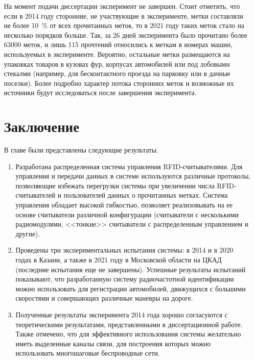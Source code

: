 На момент подачи диссертации эксперимент не завершен. Стоит отметить, что если в 2014 году сторонние, не участвующие в эксперименте, метки составляли не более 10~\% от всех прочитанных меток, то в 2021 году таких меток стало на несколько порядков больше. Так, за 26 дней эксперимента было прочитано более 63000 меток, и лишь 115 прочтений относились к меткам в номерах машин, используемых в эксперименте. Вероятно, остальные метки размещаются на упаковках товаров в кузовах фур, корпусах автомобилей или под лобовыми стекалми (например, для бесконтактного проезда на парковку или в дачные поселки). Более подробно характер потока сторонних меток и возможные их источники будут исследоваться после завершения эксперимента.



\section{Заключение}\label{sec:ch5_conclusion}

В главе были представлены следующие результаты.

\begin{enumerate}
  \item Разработана распределенная система управления RFID-считывателями. Для управления и передачи данных в системе используются различные протоколы, позволяющие избежать перегрузки системы при увеличении числа RFID-считывателей и пользователей данных о прочитанных метках. Система управления обладает высокой гибкостью, позволяет реализовывать на ее основе считыватели различной конфигурации (считыватели с несколькими радиомодулями, <<тонкие>> считыватели с распределенным управлением и другие).
  \item Проведены три экспериментальных испытания системы: в 2014 и в 2020 годах в Казани, а также в 2021 году в Московской области на ЦКАД (последние испытания еще не завершены). Успешные результаты испытаний показывают, что разработанную систему радиочастотной идентификации можно использовать для регистрации автомобилей, движущихся с большими скоростями и совершающих различные маневры на дороге.
  \item Полученные результаты эксперимента 2014 года хорошо согласуются с теоретическими результатами, представленными в диссертационной работе. Также отмечено, что для эффективного использования системы желательно иметь выделенные каналы связи, для построения которых можно использовать многошаговые беспроводные сети.
\end{enumerate}


\clearpage

